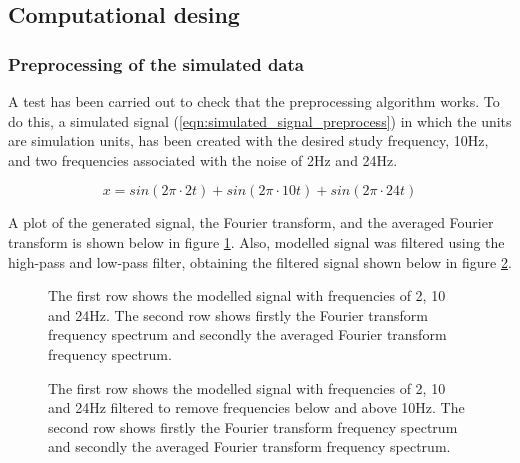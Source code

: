 \documentclass[12pt, a4paper]{article} %
\begin{document}
\setlength{\parskip}{0mm}

\subsection{Computational desing}

\subsubsection{Preprocessing of the simulated data}

A test has been carried out to check that the preprocessing algorithm works. To do this, a simulated signal (\ref{eqn:simulated_signal_preprocess}) in which the units are simulation units, has been created with the desired study frequency, 10Hz, and two frequencies associated with the noise of 2Hz and 24Hz. 

\setlength{\parskip}{4mm}

\begin{equation} \label{eqn:simulated_signal_preprocess}
	x = sin(2\pi\cdot 2t) + sin(2\pi\cdot 10t) + sin(2\pi\cdot 24t)
\end{equation}

A plot of the generated signal, the Fourier transform, and the averaged Fourier transform is shown below in figure \ref{fig:noisy_data_simulated}. Also, modelled signal was filtered using the high-pass and low-pass filter, obtaining the filtered signal shown below in figure \ref{fig:noisy_filtered_data_simulated}.

\begin{figure}[htbp]
	\centering
	
	\caption{The first row shows the modelled signal with frequencies of 2, 10 and 24Hz. The second row shows firstly the Fourier transform frequency spectrum and secondly the averaged Fourier transform frequency spectrum.}
	\label{fig:noisy_data_simulated}
\end{figure}


\begin{figure}[htbp]
	\centering
	
	\caption{The first row shows the modelled signal with frequencies of 2, 10 and 24Hz filtered to remove frequencies below and above 10Hz. The second row shows firstly the Fourier transform frequency spectrum and secondly the averaged Fourier transform frequency spectrum.}
	\label{fig:noisy_filtered_data_simulated}
\end{figure}
\end{document}
